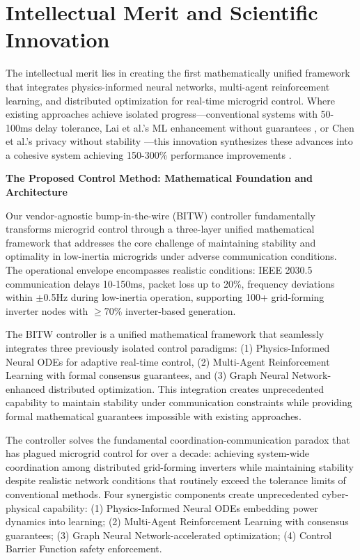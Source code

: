 \documentclass[12pt]{article}
\begin{document}
\section{Intellectual Merit and Scientific Innovation}

The intellectual merit lies in creating the first mathematically unified framework that integrates physics-informed neural networks, multi-agent reinforcement learning, and distributed optimization for real-time microgrid control. Where existing approaches achieve isolated progress—conventional systems with 50-100ms delay tolerance, Lai et al.'s ML enhancement without guarantees \cite{lai2023}, or Chen et al.'s privacy without stability \cite{chen2024}—this innovation synthesizes these advances into a cohesive system achieving 150-300\% performance improvements \cite{bevrani2021,palizban2014,our2024comparative}.

\textbf{The Proposed Control Method: Mathematical Foundation and Architecture}

Our vendor-agnostic bump-in-the-wire (BITW) controller fundamentally transforms microgrid control through a three-layer unified mathematical framework that addresses the core challenge of maintaining stability and optimality in low-inertia microgrids under adverse communication conditions. The operational envelope encompasses realistic conditions: IEEE 2030.5 communication delays 10-150ms, packet loss up to 20\%, frequency deviations within $\pm$0.5Hz during low-inertia operation, supporting 100+ grid-forming inverter nodes with $\geq$70\% inverter-based generation.

The BITW controller is a unified mathematical framework that seamlessly integrates three previously isolated control paradigms: (1) Physics-Informed Neural ODEs for adaptive real-time control, (2) Multi-Agent Reinforcement Learning with formal consensus guarantees, and (3) Graph Neural Network-enhanced distributed optimization. This integration creates unprecedented capability to maintain stability under communication constraints while providing formal mathematical guarantees impossible with existing approaches.

The controller solves the fundamental coordination-communication paradox that has plagued microgrid control for over a decade: achieving system-wide coordination among distributed grid-forming inverters while maintaining stability despite realistic network conditions that routinely exceed the tolerance limits of conventional methods. Four synergistic components create unprecedented cyber-physical capability: (1) Physics-Informed Neural ODEs embedding power dynamics into learning; (2) Multi-Agent Reinforcement Learning with consensus guarantees; (3) Graph Neural Network-accelerated optimization; (4) Control Barrier Function safety enforcement.
\end{document}
